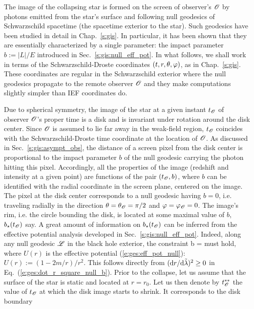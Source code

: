 The image of the collapsing star is formed on the screen of observer's $\mathscr{O}$
by photons emitted from the star's surface and following
null geodesics of Schwarzschild spacetime (the spacetime
exterior to the star). Such geodesics have been studied in detail in Chap.~\ref{s:gis}.
In particular, it has been shown that they are essentially characterized by a
single parameter: the impact parameter $b:=|L|/E$ introduced in Sec.~\ref{s:gis:null_eff_pot}.
In what follows, we shall work in terms of the Schwarzschild-Droste
coordinates $(t,r,\theta,\varphi)$, as in Chap.~\ref{s:gis}. These coordinates are regular in the Schwarzschild exterior where
the null geodesics propagate to the remote observer $\mathscr{O}$ and they
make computations slightly simpler than IEF coordinates do.

Due to spherical symmetry, the image of the star at a given instant $t_{\mathscr{O}}$ of
observer $\mathscr{O}$'s proper time is a disk and is invariant
under rotation around the disk center.
Since $\mathscr{O}$ is assumed to lie far away in the weak-field region, $t_{\mathscr{O}}$ coincides
with the Schwarzschild-Droste time coordinate at the location of $\mathscr{O}$.
As discussed in Sec.~\ref{s:gis:asympt_obs},
the distance of a screen pixel from the disk center
is proportional to the impact parameter $b$ of the null geodesic carrying the photon
hitting this pixel. Accordingly, all the properties of the image (redshift and intensity
at a given point)
are functions of the pair $(t_{\mathscr{O}}, b)$, where $b$ can be identified with the radial coordinate
in the screen plane, centered on the image.
The pixel at the disk center corresponds to a null geodesic having $b=0$, i.e.
traveling radially in the direction $\theta=\theta_{\mathscr{O}}=\pi/2$ and $\varphi=\varphi_{\mathscr{O}}=0$.
The image's rim, i.e. the circle bounding the disk, is located at some
maximal value of $b$, $b_\star(t_{\mathscr{O}})$ say.
A great amount of information on $b_\star(t_{\mathscr{O}})$ can be inferred from the effective
potential analysis developed in Sec.~\ref{s:gis:null_eff_pot}. Indeed, along
any null geodesic $\mathscr{L}$ in the black hole exterior,
the constraint
\be \label{e:lem:OS:b_constraint}
    b \leq {} = 
\ee
must hold, where $U(r)$ is the effective potential (\ref{e:ges:eff_pot_null}):
$U(r) := (1 - 2m/r)/r^2$. This follows directly from
$({\mathrm{d} r}/{\mathrm{d}\tilde{\lambda}})^2\geq 0$ in Eq.~(\ref{e:ges:dot_r_square_null_b}).
Prior to the collapse, let us assume
that the surface of the star is static and located at $r = r_0$.
Let us then denote by $t_{\mathscr{O}}^{**}$ the value of $t_{\mathscr{O}}$ at which the disk image
starts to shrink. It corresponds to the disk boundary
